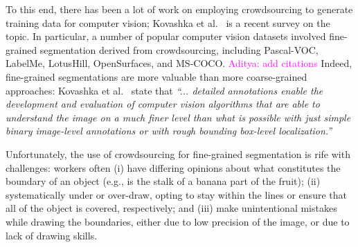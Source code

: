 \documentclass[letterpaper]{article} %
\newcommand{\agp}[1]{\textcolor{magenta}{Aditya: #1}}
\begin{document}
\par To this end, there has been a lot of work on 
employing crowdsourcing to generate training data for 
computer vision; Kovashka et al.~\cite{AdrianaKovashka2016}
is a recent survey 
on the topic.
In particular, a number of popular computer vision datasets
involved fine-grained 
segmentation derived from crowdsourcing, 
including Pascal-VOC, LabelMe, LotusHill, OpenSurfaces, and MS-COCO.
\agp{add citations}
Indeed, fine-grained segmentations are more
valuable than more coarse-grained approaches: Kovashka et al.~\cite{AdrianaKovashka2016} 
state that {\em ``... detailed annotations 
enable the development and evaluation
of computer vision algorithms 
that are able to understand the image
on a much finer level than what is 
possible with just simple binary
image-level annotations or with rough bounding box-level localization.''}

\par Unfortunately, the use of crowdsourcing
for fine-grained segmentation is rife with challenges:
workers often (i) have differing opinions about what
constitutes the boundary of an object (e.g.,
is the stalk of a banana part of the fruit);
(ii) systematically under or over-draw, opting to
stay within the lines or ensure that all of the object
is covered, respectively; and 
(iii) make unintentional mistakes while 
drawing the boundaries, either due to low precision
of the image, or due to lack of drawing skills. 


\end{document}
